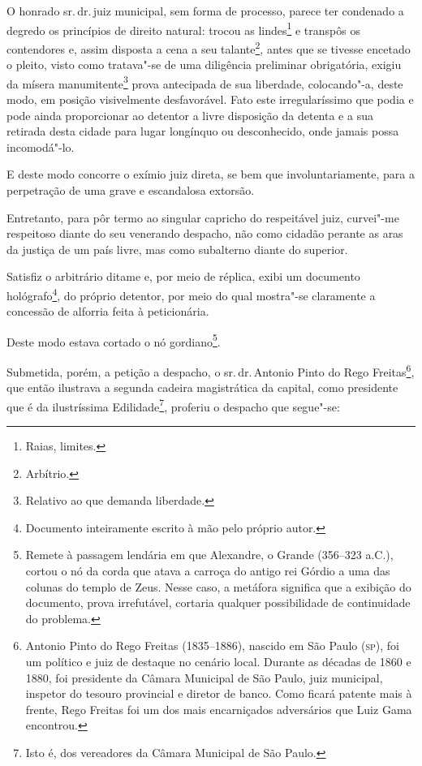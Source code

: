 O honrado sr.\,dr.\,juiz municipal, sem forma de processo, parece ter
condenado a degredo os princípios de direito natural: trocou as
lindes\footnote{Raias, limites.} e transpôs os contendores e, assim
disposta a cena a seu talante\footnote{Arbítrio.}, antes que se
tivesse encetado o pleito, visto como tratava"-se de uma diligência
preliminar obrigatória, exigiu da mísera manumitente\footnote{Relativo
  ao que demanda liberdade.} prova antecipada de sua liberdade,
colocando"-a, deste modo, em posição visivelmente desfavorável. Fato este
irregularíssimo que podia e pode ainda proporcionar ao detentor a livre
disposição da detenta e a sua retirada desta cidade para lugar longínquo
ou desconhecido, onde jamais possa incomodá"-lo.

E deste modo concorre o exímio juiz direta, se bem que
involuntariamente, para a perpetração de uma grave e escandalosa
extorsão.

Entretanto, para pôr termo ao singular capricho do respeitável juiz,
curvei"-me respeitoso diante do seu venerando despacho, não como cidadão
perante as aras da justiça de um país livre, mas como subalterno diante
do superior.

Satisfiz o arbitrário ditame e, por meio de réplica, exibi um documento
hológrafo\footnote{Documento inteiramente escrito à mão pelo próprio
  autor.}, do próprio detentor, por meio do qual mostra"-se claramente a
concessão de alforria feita à peticionária.

Deste modo estava cortado o nó gordiano\footnote{Remete à passagem \label{gordio}
  lendária em que Alexandre, o Grande (356--323 a.C.), cortou o nó da
  corda que atava a carroça do antigo rei Górdio a uma das colunas do
  templo de Zeus. Nesse caso, a metáfora significa que a exibição do
  documento, prova irrefutável, cortaria qualquer possibilidade de
  continuidade do problema.}.

Submetida, porém, a petição a despacho, o sr.\,dr.\,Antonio Pinto do Rego
Freitas\footnote{Antonio Pinto do Rego Freitas (1835--1886), nascido em
  São Paulo (\textsc{sp}), foi um político e juiz de destaque no cenário local.
  Durante as décadas de 1860 e 1880, foi presidente da Câmara Municipal
  de São Paulo, juiz municipal, inspetor do tesouro provincial e diretor
  de banco. Como ficará patente mais à frente, Rego Freitas foi um dos
  mais encarniçados adversários que Luiz Gama encontrou.}, que então
ilustrava a segunda cadeira magistrática da capital, como presidente que
é da ilustríssima Edilidade\footnote{Isto é, dos vereadores da Câmara
  Municipal de São Paulo.}, proferiu o despacho que segue"-se:

